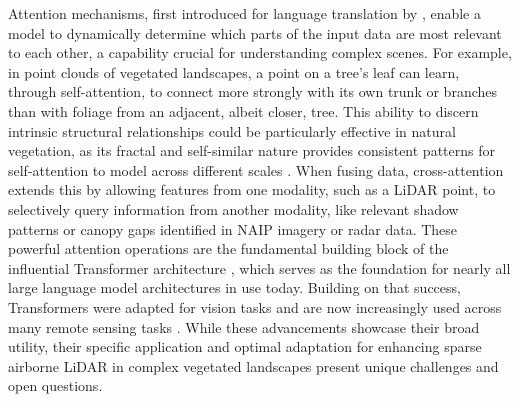 \documentclass[remotesensing,article,submit,pdftex,moreauthors]{Definitions/mdpi}
\begin{document}
Attention mechanisms, first introduced for language translation by \cite{bahdanau2014neural}, enable a model to dynamically determine which parts of the input data are most relevant to each other, a capability crucial for understanding complex scenes. For example, in point clouds of vegetated landscapes, a point on a tree’s leaf can learn, through self-attention, to connect more strongly with its own trunk or branches than with foliage from an adjacent, albeit closer, tree. This ability to discern intrinsic structural relationships could be particularly effective in natural vegetation, as its fractal and self-similar nature provides consistent patterns for self-attention to model across different scales \cite{scheuring1994application, yang2015extraction}. When fusing data, cross-attention extends this by allowing features from one modality, such as a LiDAR point, to selectively query information from another modality, like relevant shadow patterns or canopy gaps identified in NAIP imagery or radar data. These powerful attention operations are the fundamental building block of the influential Transformer architecture \cite{vaswani2017attention}, which serves as the foundation for nearly all large language model architectures in use today. Building on that success, Transformers were adapted for vision tasks \cite{dosovitskiy2020image} and are now increasingly used across many remote sensing tasks \cite{aleissaee2023transformers}. While these advancements showcase their broad utility, their specific application and optimal adaptation for enhancing sparse airborne LiDAR in complex vegetated landscapes present unique challenges and open questions.
\end{document}
